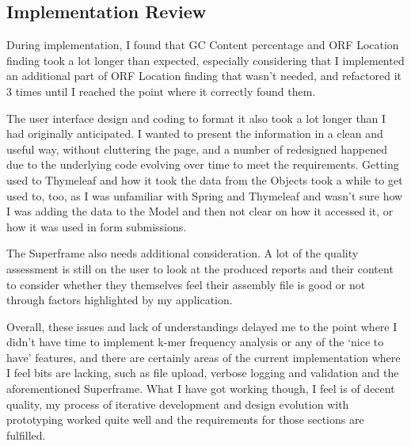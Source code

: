 \subsection{Implementation Review}
During implementation, I found that GC Content percentage and ORF Location finding took a lot longer than expected, especially considering that I implemented an additional part of ORF Location finding that wasn't needed, and refactored it 3 times until I reached the point where it correctly found them.

The user interface design and coding to format it also took a lot longer than I had originally anticipated. I wanted to present the information in a clean and useful way, without cluttering the page, and a number of redesigned happened due to the underlying code evolving over time to meet the requirements. Getting used to Thymeleaf and how it took the data from the Objects took a while to get used to, too, as I was unfamiliar with Spring and Thymeleaf and wasn't sure how I was adding the data to the Model and then not clear on how it accessed it, or how it was used in form submissions.

The Superframe also needs additional consideration. A lot of the quality assessment is still on the user to look at the produced reports and their content to consider whether they themselves feel their assembly file is good or not through factors highlighted by my application. 

Overall, these issues and lack of understandings delayed me to the point where I didn't have time to implement k-mer frequency analysis or any of the `nice to have' features, and there are certainly areas of the current implementation where I feel bits are lacking, such as file upload, verbose logging and validation and the aforementioned Superframe. What I have got working though, I feel is of decent quality, my process of iterative development and design evolution with prototyping worked quite well and the requirements for those sections are fulfilled.



